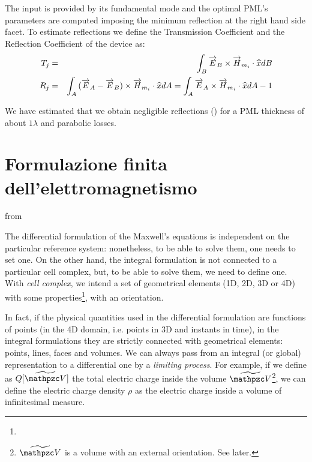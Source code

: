 
The input is provided by its fundamental mode and the optimal PML's
parameters are computed imposing the minimum reflection at the right
hand side facet. To estimate reflections we define the Transmission
Coefficient and the Reflection Coefficient of the device as:
\begin{eqnarray}
  T_j & = & \int_B {{\overrightarrow{E}_B \times \overrightarrow{H}_{m_i}} \cdot \widehat{x}} dB
  \label{eqn:T} \\
  R_j & = & \int_A {{(\overrightarrow{E}_A-\overrightarrow{E}_B) \times \overrightarrow{H}_{m_i}} \cdot \widehat{x}}
  dA = \int_A {{\overrightarrow{E}_A \times \overrightarrow{H}_{m_i}} \cdot \widehat{x}} dA - 1
  \label{eqn:T}
\end{eqnarray}

We have estimated that we obtain negligible reflections () for a PML thickness of about $1 \lambda$ and parabolic
  losses.

  




\section{Formulazione finita dell'elettromagnetismo}
from \cite{tonti_formulazione}

The differential formulation of the Maxwell's equations is independent
on the particular reference system: nonetheless, to be able to solve
them, one needs to set one. On the other hand, the integral
formulation is not connected to a particular cell complex, but, to
be able to solve them, we need to define one. With \emph{cell
  complex}, we intend a set of geometrical elements (1D, 2D, 3D or 4D)
with some properties\footnote{}, with an orientation.

In fact, if the physical quantities used in the differential
formulation are functions of points (in the 4D domain, i.e. points in
3D and instants in time), in the integral formulations they are
strictly connected with geometrical elements: points, lines, faces and
volumes. We can always pass from an integral (or global)
representation to a differential one by a \emph{limiting process}. For
example, if we define as $Q[\DualVolume{V}]$ the total electric charge inside the
volume $\DualVolume{V}$\footnote{$\DualVolume{V}$ is a volume with an external
  orientation. See later.}, we can define the electric charge density
$\rho$ as the electric charge inside a volume of infinitesimal
measure.

